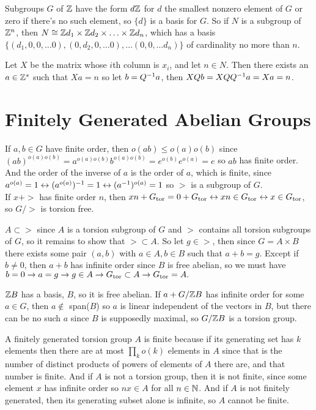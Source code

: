 \documentclass[11pt, oneside]{article}   	%
\begin{document}
\item Subgroups $G$ of $\mathbb{Z}$ have the form $d\mathbb{Z}$ for $d$ the smallest nonzero element of $G$ or zero if there's no such element, so $\{d\}$ is a basis for $G$. So if $N$ is a subgroup of $\mathbb{Z}^n$, then $N \cong \mathbb{Z} d_1 \times \mathbb{Z} d_2 \times \ldots \times \mathbb{Z} d_n$, which has a basis $\{(d_1, 0, 0, \ldots 0), (0, d_2, 0, \ldots 0), \ldots (0, 0, \ldots d_n)\}$ of cardinality no more than $n$.
\item Let $X$ be the matrix whose $i$th column is $x_i$, and let $n \in N$. Then there exists an $a \in \mathbb{Z}^s$ such that $Xa = n$ so let $b = Q^{-1} a$, then $XQb = XQQ^{-1} a = Xa = n$.
\item \blacksmiley
\ee
\section{Finitely Generated Abelian Groups}
\be
\item If $a, b \in G$ have finite order, then $o(ab) \le o(a)o(b)$ since $(ab)^{o(a)o(b)} = a^{o(a)o(b)}b^{o(a)o(b)} = e^{o(b)}e^{o(a)} = e$ so $ab$ has finite order. And the order of the inverse of $a$ is the order of $a$, which is finite, since $a^{o(a)} = 1 \leftrightarrow (a^{o(a)})^{-1} = 1 \leftrightarrow (a^{-1})^{o(a)} = 1$ so $\gt$ is a subgroup of $G$. \\
If $x + \gt$ has finite order $n$, then $xn + G_{\text{tor}} = 0 + G_{\text{tor}} \leftrightarrow xn \in G_{\text{tor}} \leftrightarrow x \in G_{\text{tor}}$, so $G / \gt$ is torsion free.
\item $A \subset \gt$ since $A$ is a torsion subgroup of $G$ and $\gt$ contains all torsion subgroups of $G$, so it remains to show that $\gt \subset A$. So let $g \in \gt$, then since $G = A \times B$ there exists some pair $(a, b)$ with $a \in A, b \in B$ such that $a + b = g$. Except if $b \not = 0$, then $a + b$ has infinite order since $B$ is free abelian, so we must have $b = 0 \rightarrow a = g \rightarrow g \in A \rightarrow G_{\text{tor}} \subset A \rightarrow G_{\text{tor}} = A.$
\item $\mathbb{Z} B$ has a basis, $B$, so it is free abelian. If $a + G / \mathbb{Z} B$ has infinite order for some $a \in G$, then $a\not \in$ span($B$) so $a$ is linear independent of the vectors in $B$, but there can be no such $a$ since $B$ is supposedly maximal, so $G / \mathbb{Z} B$ is a torsion group.
\item A finitely generated torsion group $A$ is finite because if its generating set has $k$ elements then there are at most $\prod_ko(k)$ elements in $A$ since that is the number of distinct products of powers of elements of $A$ there are, and that number is finite. And if $A$ is not a torsion group, then it is not finite, since some element $x$ has infinite order so $nx \in A$ for all $n \in \mathbb{N}$. And if $A$ is not finitely generated, then its generating subset alone is infinite, so $A$ cannot be finite.
\end{document}

